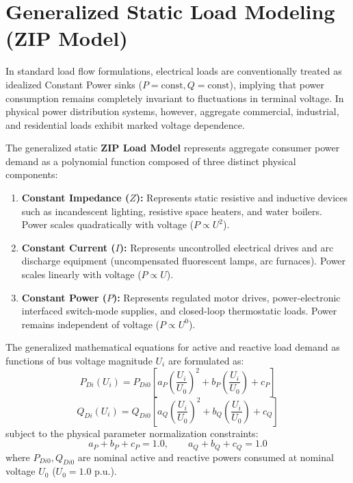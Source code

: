 \documentclass[12pt,a4paper,oneside]{report}
\begin{document}
\section{Generalized Static Load Modeling (ZIP Model)}
In standard load flow formulations, electrical loads are conventionally treated as idealized Constant Power sinks ($P = \text{const}, Q = \text{const}$), implying that power consumption remains completely invariant to fluctuations in terminal voltage. In physical power distribution systems, however, aggregate commercial, industrial, and residential loads exhibit marked voltage dependence.

The generalized static \textbf{ZIP Load Model} represents aggregate consumer power demand as a polynomial function composed of three distinct physical components:
\begin{enumerate}
    \item \textbf{Constant Impedance ($Z$):} Represents static resistive and inductive devices such as incandescent lighting, resistive space heaters, and water boilers. Power scales quadratically with voltage ($P \propto U^2$).
    \item \textbf{Constant Current ($I$):} Represents uncontrolled electrical drives and arc discharge equipment (uncompensated fluorescent lamps, arc furnaces). Power scales linearly with voltage ($P \propto U$).
    \item \textbf{Constant Power ($P$):} Represents regulated motor drives, power-electronic interfaced switch-mode supplies, and closed-loop thermostatic loads. Power remains independent of voltage ($P \propto U^0$).
\end{enumerate}

The generalized mathematical equations for active and reactive load demand as functions of bus voltage magnitude $U_i$ are formulated as:
\begin{equation}
P_{Di}(U_i) = P_{Di0} \left[ a_P \left(\frac{U_i}{U_0}\right)^2 + b_P \left(\frac{U_i}{U_0}\right) + c_P \right]
\end{equation}
\begin{equation}
Q_{Di}(U_i) = Q_{Di0} \left[ a_Q \left(\frac{U_i}{U_0}\right)^2 + b_Q \left(\frac{U_i}{U_0}\right) + c_Q \right]
\end{equation}
subject to the physical parameter normalization constraints:
\begin{equation}
a_P + b_P + c_P = 1.0, \qquad a_Q + b_Q + c_Q = 1.0
\end{equation}
where $P_{Di0}, Q_{Di0}$ are nominal active and reactive powers consumed at nominal voltage $U_0$ ($U_0 = 1.0\text{ p.u.}$).
\end{document}
